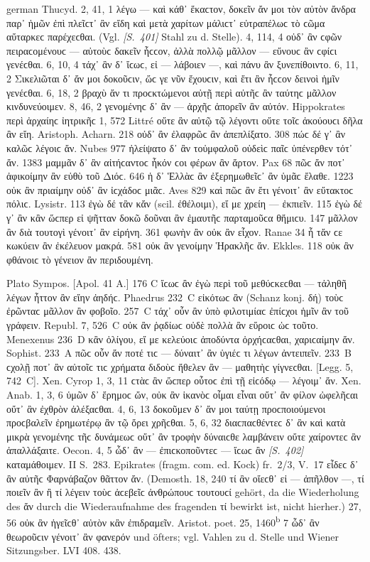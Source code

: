 \begin{otherlanguage*}{german}
Thucyd. 2, 41, 1 λέγω — καὶ κάθ᾽ ἕκαϲτον, δοκεῖν ἄν μοι τὸν αὐτὸν ἄνδρα παρ᾽ ἡμῶν ἐπὶ πλεῖϲτ᾽ ἂν εἴδη καὶ μετὰ χαρίτων μάλιϲτ᾽ εὐτραπέλωϲ τὸ ϲῶμα αὔταρκεϲ παρέχεϲθαι. (Vgl. \hypertarget{p401}{\emph{[S.~401]}}\label{p401} Stahl zu d. Stelle). 4, 114, 4 οὐδ᾽ ἂν ϲφῶν πειραϲομένουϲ — αὐτοὺϲ δακεῖν ἧϲϲον, ἀλλὰ πολλῷ μᾶλλον — εὔνουϲ ἂν ϲφίϲι γενέϲθαι. 6, 10, 4 τάχ᾽ ἂν δ᾽ ἴϲωϲ, εἰ — λάβοιεν —, καὶ πάνυ ἂν ξυνεπίθοιντο. 6, 11, 2 Σικελιῶται δ᾽ ἄν μοι δοκοῦϲιν, ὥϲ γε νῦν ἔχουϲιν, καὶ ἔτι ἂν ἧϲϲον δεινοὶ ἡμῖν γενέϲθαι. 6, 18, 2 βραχὺ ἄν τι προϲκτώμενοι αὐτῇ περὶ αὐτῆϲ ἂν ταύτηϲ μᾶλλον κινδυνεύοιμεν. 8, 46, 2 γενομένηϲ δ᾽ ἂν — ἀρχῆϲ ἀπορεῖν ἂν αὐτόν. Hippokrates περὶ ἀρχαίηϲ ἰητρικῆϲ 1, 572 Littré οὔτε ἂν αὐτῷ τῷ λέγοντι οὔτε τοῖϲ ἀκούουϲι δῆλα ἂν εἴη. Aristoph. Acharn. 218 οὐδ᾽ ἂν ἐλαφρῶϲ ἂν ἀπεπλίξατο. 308 πώϲ δέ γ᾽ ἂν καλῶϲ λέγοιϲ ἄν. Nubes 977 ἠλείψατο δ᾽ ἂν τοὐμφαλοῦ οὐδεὶϲ παῖϲ ὑπένερθεν τότ᾽ ἄν. 1383 μαμμᾶν δ᾽ ἂν αἰτήϲαντοϲ ἧκόν ϲοι φέρων ἂν ἄρτον. Pax 68 πῶϲ ἄν ποτ᾽ ἀφικοίμην ἂν εὐθὺ τοῦ Διόϲ. 646 ἡ δ᾽ Ἑλλὰϲ ἂν ἐξερημωθεῖϲ᾽ ἂν ὑμᾶϲ ἔλαθε. 1223 οὐκ ἂν πριαίμην οὐδ᾽ ἂν ἰϲχάδοϲ μιᾶϲ. Aves 829 καὶ πῶϲ ἂν ἔτι γένοιτ᾽ ἂν εὔτακτοϲ πόλιϲ. Lysistr. 113 ἐγὼ δέ τἂν κἄν (scil. ἐθέλοιμι), εἴ με χρείη — ἐκπιεῖν. 115 ἐγὼ δέ γ᾽ ἂν κἂν ὥϲπερ εἰ ψῆτταν δοκῶ δοῦναι ἂν ἐμαυτῆϲ παρταμοῦϲα θἤμιϲυ. 147 μᾶλλον ἂν διὰ τουτογὶ γένοιτ᾽ ἂν εἰρήνη. 361 φωνὴν ἂν οὐκ ἂν εἶχον. Ranae 34 ἦ τἄν ϲε κωκύειν ἂν ἐκέλευον μακρά. 581 οὐκ ἂν γενοίμην Ἡρακλῆϲ ἄν. Ekkles. 118 οὐκ ἂν φθάνοιϲ τὸ γένειον ἂν περιδουμένη.

Plato Sympos. [Apol. 41 Α.] 176 C ἴϲωϲ ἂν ἐγὼ περὶ τοῦ μεθύϲκεϲθαι — τἀληθῆ λέγων ἧττον ἂν εἴην ἀηδήϲ. Phaedrus 232~C εἰκότωϲ ἂν (Schanz konj. δή) τοὺϲ ἐρῶνταϲ μᾶλλον ἂν φοβοῖο. 257~C τάχ᾽ οὖν ἂν ὑπὸ φιλοτιμίαϲ ἐπίϲχοι ἡμῖν ἂν τοῦ γράφειν. Republ. 7, 526~C οὐκ ἂν ῥᾳδίωϲ οὐδὲ πολλὰ ἂν εὕροιϲ ὡϲ τοῦτο. Menexenus 236~D κἂν ὀλίγου, εἴ με κελεύοιϲ ἀποδύντα ὀρχήϲαϲθαι, χαριϲαίμην ἄν. Sophist. 233~A πῶϲ οὖν ἄν ποτέ τιϲ — δύναιτ᾽ ἂν ὑγιέϲ τι λέγων ἀντειπεῖν. 233~Β ϲχολῇ ποτ᾽ ἂν αὐτοῖϲ τιϲ χρήματα διδοὺϲ ἤθελεν ἂν — μαθητὴϲ γίγνεϲθαι. [Legg. 5, 742~C]. Xen. Cyrop 1, 3, 11 ϲτὰϲ ἂν ὥϲπερ οὗτοϲ ἐπὶ τῇ εἰϲόδῳ — λέγοιμ᾽ ἄν. Xen. Anab. 1, 3, 6 ὑμῶν δ᾽ ἔρημοϲ ὤν, οὐκ ἂν ἱκανὸϲ οἶμαι εἶναι οὔτ᾽ ἂν φίλον ὠφελῆϲαι οὔτ᾽ ἂν ἐχθρὸν ἀλέξαϲθαι. 4, 6, 13 δοκοῦμεν δ᾽ ἄν μοι ταύτῃ προϲποιούμενοι προϲβαλεῖν ἐρημωτέρῳ ἂν τῷ ὄρει χρῆϲθαι. 5, 6, 32 διαϲπαϲθέν\-τεϲ δ᾽ ἂν καὶ κατὰ μικρὰ γενομένηϲ τῆϲ δυνάμεωϲ οὔτ᾽ ἂν τροφὴν δύναιϲθε λαμβάνειν οὔτε χαίροντεϲ ἂν ἀπαλλάξαιτε. Oecon. 4, 5 ὦδ᾽ ἂν — ἐπιϲκοποῦντεϲ — ἴϲωϲ ἂν  \hypertarget{p402}{\emph{[S.~402]}}\label{p402} καταμάθοιμεν. II S.~283. Epikrates (fragm. com. ed. Kock) fr.~2/3, V.~17 εἶδεϲ δ᾽ ἂν αὐτῆϲ Φαρνάβαζον θᾶττον ἄν. (Demosth. 18, 240 τί ἂν οἴεϲθ᾽ εἰ — ἀπῆλθον —, τί ποιεῖν ἂν ἢ τί λέγειν τοὺϲ ἀϲεβεῖϲ ἀνθρώπουϲ τουτουϲί gehört, da die Wiederholung des ἄν durch die Wiederaufnahme des fragenden τί bewirkt ist, nicht hierher.) 27, 56 οὐκ ἂν ἡγεῖϲθ᾽ αὐτὸν κἂν ἐπιδραμεῖν. Aristot. poet. 25, 1460\textsuperscript{b} 7 ὧδ᾽ ἂν θεωροῦϲιν γένοιτ᾽ ἂν φανερόν und öfters; vgl. Vahlen zu d. Stelle und Wiener Sitzungsber. LVI 408. 438.


\end{otherlanguage*}
